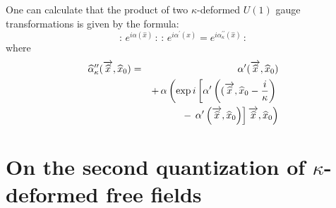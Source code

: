 \documentclass[a4paper,a4paper]{article}
\begin{document}
One can calculate that the product of two $\kappa$-deformed
$U(1)$ gauge transformations is given by the formula:
\begin{equation}\label{luno48}    %
:\,   e^{i\alpha ( \widehat{x})}\, : \, : \,
  e^{i\alpha^{\prime}( \widehat{x})} =
  e^{i\alpha^{\prime\prime}_{\kappa}( \widehat{x})}  \, :
\end{equation}
where
\begin{eqnarray}\label{luma50x}
  \widehat{\alpha}^{\prime\prime}_{\kappa}
  (\overrightarrow{\widehat{x}},\widehat{x}_{0}) &=&
  \alpha^{\prime}
  (\overrightarrow{\widehat{x}},\widehat{x}_{0})
  \cr
  &&  + \,
  \alpha \left(
  \exp i \left[
  \alpha^{\prime} \left(
  (\overrightarrow{\widehat{x}},\widehat{x}_{0} - {i\over \kappa}
  \right) \right.\right.
  \cr
  &&
  -
\left.\left.
  \alpha^{\prime} \left(
  \overrightarrow{\widehat{x}},\widehat{x}_{0}\right)\right]
\overrightarrow{\widehat{x}},\widehat{x}_{0}\right)
\end{eqnarray}



\section{On the
  second quantization of $\kappa$-deformed free fields}
\end{document}
